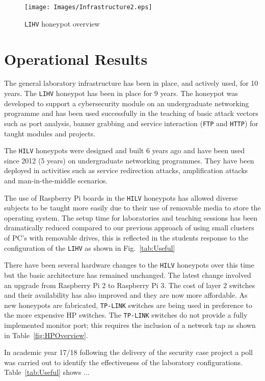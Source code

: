 \documentclass[10pt,journal]{IEEEtran}
\begin{document}
\begin{figure}[h]
\begin{center}
	\texttt{[image: Images/Infrastructure2.eps]}
  \caption{\texttt{LIHV} honeypot overview}
\label{fig:Overview2}
\end{center}
\end{figure}

\section{Operational Results\label{sec:Results}}

The general laboratory infrastructure has been in place, and actively used, for
10 years. The \texttt{LIHV} honeypot has been in place for 9 years. The
honeypot was developed to support a cybersecurity module on an undergraduate
networking programme and has been used successfully in the teaching of basic
attack vectors such as port analysis, banner grabbing and service interaction
(\texttt{FTP} and \texttt{HTTP}) for taught modules and projects.

The \texttt{HILV} honeypots were designed and built 6 years ago and have been
used since 2012 (5 years) on undergraduate networking programmes. They have been
deployed in activities such as service redirection attacks, amplification
attacks and man-in-the-middle scenarios.

The use of Raspberry Pi boards in the \texttt{HILV} honeypots has allowed
diverse subjects to be taught more easily due to their use of removable media
to store the operating system. The setup time for laboratories and teaching
sessions has been dramatically reduced compared to our previous approach of
using small clusters of PC's with removable drives, this is reflected in the students response to the configuration of the \texttt{LIHV} as shown in Fig.~\ref{tab:Useful}

There have been several hardware changes to the \texttt{HILV} honeypots over
this time but the basic architecture has remained unchanged. The latest change
involved an upgrade from Raspberry Pi 2 to Raspberry Pi 3. The cost of layer 2
switches and their availability has also improved and they are now more
affordable. As new honeypots are fabricated, \texttt{TP-LINK} switches are being used in
preference to the more expensive HP switches. The \texttt{TP-LINK} switches do not
provide a fully implemented monitor port; this requires the inclusion of a
network tap as shown in Table~\ref{fig:HPOverview}.

In academic year 17/18 following the delivery of the security case project a poll was carried out to identify the effectiveness of the laboratory configurations. Table~\ref{tab:Useful} shows ...
\end{document}
